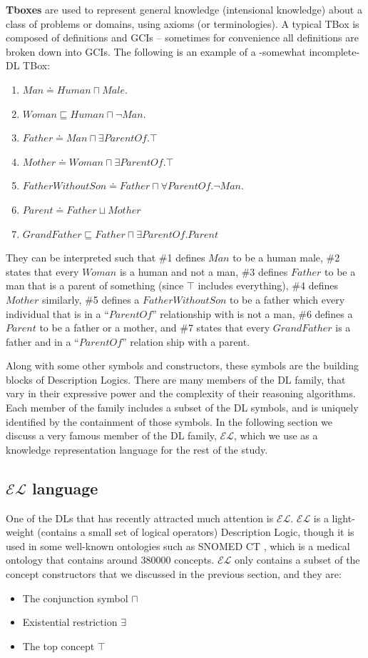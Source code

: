 \textbf{Tboxes} are used to represent general knowledge (intensional knowledge) about a class of problems or domains, using axioms (or terminologies). A typical TBox is composed of definitions and GCIs -- sometimes for convenience all definitions are broken down into GCIs. The following is an example of a -somewhat incomplete- DL TBox:
\begin{enumerate}
\item $Man \doteq Human \sqcap Male$.
\item $Woman \sqsubseteq Human \sqcap \neg Man$.
\item $Father \doteq Man \sqcap \exists ParentOf. \top$
\item $Mother \doteq Woman \sqcap \exists ParentOf. \top$
\item $FatherWithoutSon \doteq Father \sqcap \forall ParentOf. \neg Man$.
\item $Parent \doteq Father \sqcup Mother$
\item $GrandFather \sqsubseteq Father \sqcap \exists ParentOf.Parent$
\end{enumerate}
They can be interpreted such that \#1 defines $Man$ to be a human male, \#2 states that every $Woman$ is a human and not a man, \#3 defines $Father$ to be a man that is a parent of something (since $\top$ includes everything), \#4 defines $Mother$ similarly, \#5 defines a $FatherWithoutSon$ to be a father which every individual that is in a ``$ParentOf$'' relationship with is not a man, \#6 defines a $Parent$ to be a father or a mother, and \#7 states that every $GrandFather$ is a father and in a ``$ParentOf$'' relation ship with a parent.

Along with some other symbols and constructors, these symbols are the building blocks of Description Logics. There are many members of the DL family, that vary in their expressive power and the complexity of their reasoning algorithms. Each member of the family includes a subset of the DL symbols, and is uniquely identified by the containment of those symbols. In the following section we discuss a very famous member of the DL family, $\mathcal{EL}$, which we use as a knowledge representation language for the rest of the study.


\subsection{$\mathcal{EL}$ language}
One of the DLs that has recently attracted much attention is $\mathcal{EL}$. $\mathcal{EL}$ is a light-weight (contains a small set of logical operators) Description Logic, though it is used in some well-known ontologies such as SNOMED CT \cite{new}, which is a medical ontology that contains around 380000 concepts. $\mathcal{EL}$ only contains a subset of the concept constructors that we discussed in the previous section, and they are:
\begin{itemize}
\item The conjunction symbol $\sqcap$
\item Existential restriction $\exists$
\item The top concept $\top$
\end{itemize}

